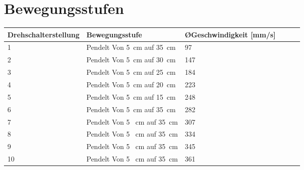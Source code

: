 %
%

\chapter{Bewegungsstufen} \label{bew}


\fontsize{8}{10}\selectfont
\begin{tabularx}{\textwidth}{|p{3cm}|X|X|X|p{1cm}|X|}
	\hline 
	\textbf{Drehschalterstellung}  & \textbf{Bewegungsstufe} & \textbf{ \O Geschwindigkeit [mm/s]}    \\ \hline
	1 & Pendelt Von 5\ cm auf 35\ cm & 97   \\
	\hline
	2 & Pendelt Von 5\ cm auf 30\ cm & 147 \\
	\hline
	3 & Pendelt Von 5\ cm auf 25\ cm & 184 \\
	\hline
	4 & Pendelt Von 5\ cm auf 20\ cm & 223 \\
	\hline
	5 & Pendelt Von 5\ cm auf 15\ cm & 248 \\
	\hline
	6 & Pendelt Von 5\ cm auf 35\ cm & 282 \\
	\hline
	7 & Pendelt Von 5 \ cm auf 35\ cm & 307 \\
	\hline
	8 & Pendelt Von 5 \ cm auf 35\ cm & 334\\
	\hline
	9 & Pendelt Von 5 \ cm auf 35\ cm & 345 \\
	\hline
	10 & Pendelt Von 5 \ cm auf 35\ cm & 361 \\
	\hline
	
	
\end{tabularx}

 \label{BewegStufTab}



